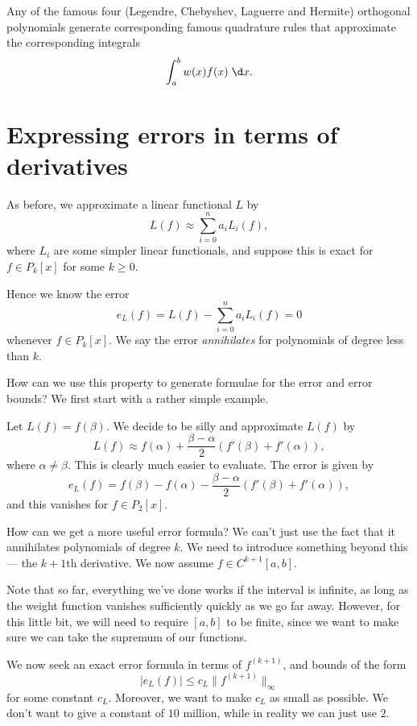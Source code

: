 \documentclass[a4paper]{article}
\begin{document}
\begin{eg}
  Any of the famous four (Legendre, Chebyshev, Laguerre and Hermite) orthogonal polynomials generate corresponding famous quadrature rules that approximate the corresponding integrals
  \[
    \int_a^b w(x) f(x)\;\d x.
  \]
\end{eg}

\section{Expressing errors in terms of derivatives}
As before, we approximate a linear functional $L$ by
\[
  L(f) \approx \sum_{i = 0}^n a_i L_i(f),
\]
where $L_i$ are some simpler linear functionals, and suppose this is exact for $f \in P_k[x]$ for some $k \geq 0$.

Hence we know the error
\[
  e_L(f) = L(f) - \sum_{i = 0}^n a_i L_i(f) = 0
\]
whenever $f \in P_k[x]$. We say the error \emph{annihilates} for polynomials of degree less than $k$.

How can we use this property to generate formulae for the error and error bounds? We first start with a rather simple example.
\begin{eg}
  Let $L(f) = f(\beta)$. We decide to be silly and approximate $L(f)$ by
  \[
    L(f) \approx f(\alpha) + \frac{\beta - \alpha}{2} (f'(\beta) + f'(\alpha)),
  \]
  where $\alpha \not= \beta$. This is clearly much easier to evaluate. The error is given by
  \[
    e_L(f) = f(\beta) - f(\alpha) - \frac{\beta - \alpha}{2} (f'(\beta) + f'(\alpha)),
  \]
  and this vanishes for $f \in P_2[x]$.
\end{eg}
How can we get a more useful error formula? We can't just use the fact that it annihilates polynomials of degree $k$. We need to introduce something beyond this --- the $k + 1$th derivative. We now assume $f \in C^{k + 1}[a, b]$.

Note that so far, everything we've done works if the interval is infinite, as long as the weight function vanishes sufficiently quickly as we go far away. However, for this little bit, we will need to require $[a, b]$ to be finite, since we want to make sure we can take the supremum of our functions.

We now seek an exact error formula in terms of $f^{(k + 1)}$, and bounds of the form
\[
  |e_L(f)| \leq c_L \|f^{(k + 1)}\|_{\infty}
\]
for some constant $c_L$. Moreover, we want to make $c_L$ as small as possible. We don't want to give a constant of $10$ million, while in reality we can just use $2$.
\end{document}
